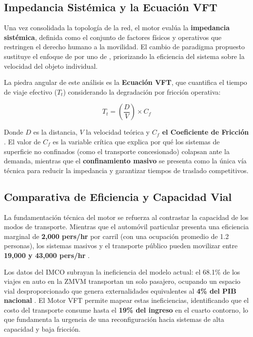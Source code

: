 \subsection{Impedancia Sistémica y la Ecuación VFT}
\label{subsubsec:impendancia-VFT}

Una vez consolidada la topología de la red, el motor evalúa la \textbf{impedancia sistémica}, 
definida como el conjunto de factores físicos y operativos que restringen el derecho humano 
a la movilidad. El cambio de paradigma propuesto sustituye el enfoque de 
 por uno de , 
priorizando la eficiencia del sistema sobre la velocidad del objeto individual.

La piedra angular de este análisis es la \textbf{Ecuación VFT}, que cuantifica el tiempo 
de viaje efectivo ($T_t$) considerando la degradación por fricción operativa:

\begin{equation}
    T_t = \left( \frac{D}{V} \right) \times C_f
\end{equation}

Donde $D$ es la distancia, $V$ la velocidad teórica y 
\textbf{$C_f$ el Coeficiente de Fricción} \cite{Garibaldi2024VFT}. El valor de $C_f$ 
es la variable crítica que explica por qué los sistemas de superficie no confinados 
(como el transporte concesionado) colapsan ante la demanda, mientras que el 
\textbf{confinamiento masivo} se presenta como la única vía técnica para reducir 
la impedancia y garantizar tiempos de traslado competitivos.

\subsection{Comparativa de Eficiencia y Capacidad Vial}
\label{subsubsec:comparativa-eficiencia}

La fundamentación técnica del motor se refuerza al contrastar la capacidad de los modos 
de transporte. Mientras que el automóvil particular presenta una eficiencia marginal de 
\textbf{2,000 pers/hr} por carril (con una ocupación promedio de 1.2 personas), los 
sistemas masivos y el transporte público pueden movilizar entre 
\textbf{19,000 y 43,000 pers/hr} \cite{IMCO2019Doc}. 

Los datos del IMCO subrayan la ineficiencia del modelo actual: el 68.1\% de los viajes 
en auto en la ZMVM transportan un solo pasajero, ocupando un espacio vial desproporcionado 
que genera externalidades equivalentes al \textbf{4\% del PIB nacional} \cite{IMCO2019Doc}. 
El Motor VFT permite mapear estas ineficiencias, identificando que el costo del transporte 
consume hasta el \textbf{19\% del ingreso} en el cuarto contorno, lo que fundamenta la 
urgencia de una reconfiguración hacia sistemas de alta capacidad y baja fricción.
